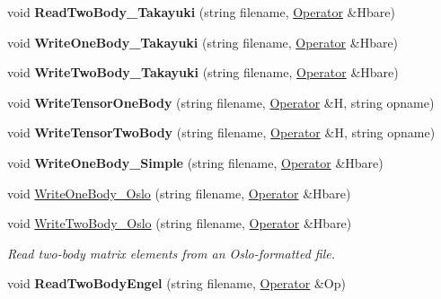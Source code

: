 \begin{DoxyCompactItemize}
\item 
void {\bfseries Read\+Two\+Body\+\_\+\+Takayuki} (string filename, \hyperlink{classOperator}{Operator} \&Hbare)\hypertarget{classReadWrite_a2c8e5f9f0f28a521501b3641390ecce4}{}\label{classReadWrite_a2c8e5f9f0f28a521501b3641390ecce4}

\item 
void {\bfseries Write\+One\+Body\+\_\+\+Takayuki} (string filename, \hyperlink{classOperator}{Operator} \&Hbare)\hypertarget{classReadWrite_a085e8fbf3a73da1e127e7454392e0bca}{}\label{classReadWrite_a085e8fbf3a73da1e127e7454392e0bca}

\item 
void {\bfseries Write\+Two\+Body\+\_\+\+Takayuki} (string filename, \hyperlink{classOperator}{Operator} \&Hbare)\hypertarget{classReadWrite_a7521de830de68614bb55147e4054c8df}{}\label{classReadWrite_a7521de830de68614bb55147e4054c8df}

\item 
void {\bfseries Write\+Tensor\+One\+Body} (string filename, \hyperlink{classOperator}{Operator} \&H, string opname)\hypertarget{classReadWrite_a95ee464b3c576804bf9a75694f39bbe3}{}\label{classReadWrite_a95ee464b3c576804bf9a75694f39bbe3}

\item 
void {\bfseries Write\+Tensor\+Two\+Body} (string filename, \hyperlink{classOperator}{Operator} \&H, string opname)\hypertarget{classReadWrite_a4d694656d136eb9f904b306e7cce9854}{}\label{classReadWrite_a4d694656d136eb9f904b306e7cce9854}

\item 
void {\bfseries Write\+One\+Body\+\_\+\+Simple} (string filename, \hyperlink{classOperator}{Operator} \&Hbare)\hypertarget{classReadWrite_ad110f60431932c6e5e276fe132b7cddb}{}\label{classReadWrite_ad110f60431932c6e5e276fe132b7cddb}

\item 
void \hyperlink{classReadWrite_a13494cd64fa5cd54c235494f2f6ad98a}{Write\+One\+Body\+\_\+\+Oslo} (string filename, \hyperlink{classOperator}{Operator} \&Hbare)
\item 
void \hyperlink{classReadWrite_a7f1aa9a0701a15d2007524f7d31df1ef}{Write\+Two\+Body\+\_\+\+Oslo} (string filename, \hyperlink{classOperator}{Operator} \&Hbare)\hypertarget{classReadWrite_a7f1aa9a0701a15d2007524f7d31df1ef}{}\label{classReadWrite_a7f1aa9a0701a15d2007524f7d31df1ef}

\begin{DoxyCompactList}\small\item\em Read two-\/body matrix elements from an Oslo-\/formatted file. \end{DoxyCompactList}\item 
void {\bfseries Read\+Two\+Body\+Engel} (string filename, \hyperlink{classOperator}{Operator} \&Op)\hypertarget{classReadWrite_a6d9f3e742be006c9b13eaf0670e58b99}{}\label{classReadWrite_a6d9f3e742be006c9b13eaf0670e58b99}


\end{DoxyCompactItemize}
